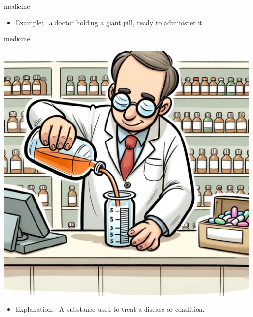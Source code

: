 \documentclass[avery5371, grid,frame]{flashcards}
\begin{document}
\begin{flashcard}{medicine}
\begin{center}
\begin{minipage}[c]{.45\textwidth}
\begin{itemize}
            \item Example: \ a doctor holding a giant pill, ready to administer it
            \end{itemize}
        \end{minipage}
    \end{center}
    \vspace*{\fill}
\end{flashcard}\begin{flashcard}{medicine}
    \vspace*{\fill}
    \begin{center}
        \begin{minipage}[c]{.45\textwidth}
            \includegraphics[width=\textwidth]{cards/m/medicine/medicine - a pharmacist behind a counter, measuring out liquid medicine into a bottle.png}
        \end{minipage}
        \begin{minipage}[c]{.45\textwidth}
            \begin{itemize}\setlength\itemsep{12pt}
            \item Explanation: \ A substance used to treat a disease or condition.


\end{itemize}
\end{minipage}
\end{center}
\end{flashcard}
\end{document}
